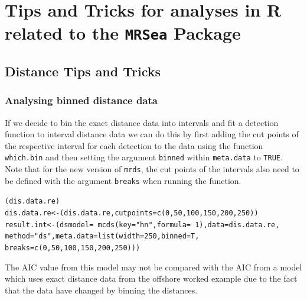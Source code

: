 
%
\chapter{Tips and Tricks for analyses in R related to the {\tt MRSea} Package}
\label{cha:tips}


\section{Distance Tips and Tricks}
\subsection{Analysing binned distance data}
\noindent If we decide to bin the exact distance data into intervals and fit a detection function to interval distance data we can do this by first adding the cut points of the respective interval for each detection to the data using the function {\tt which.bin} and then setting the argument {\tt binned} within {\tt meta.data} to {\tt TRUE}. Note that for the new version of {\tt mrds}, the cut points of the intervals also need to be defined with the argument {\tt breaks} when running the function. 
\begin{knitrout}\footnotesize
{}\color{fgcolor}\begin{kframe}
\begin{alltt}
(dis.data.re)
dis.data.re<-(dis.data.re, cutpoints=c(0,50,100,150,200,250))
result.int<-(dsmodel=~mcds(key="hn",formula=~1),data=dis.data.re, 
    method="ds", meta.data=list(width=250, binned=T, 
     breaks=c(0,50,100,150,200,250)))
\end{alltt}
\end{kframe}
\end{knitrout}

\noindent The AIC value from this model may not be compared with the AIC from a model which uses exact distance data from the offshore worked example due to the fact that the data have changed by binning the distances.  \\

